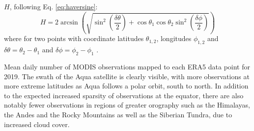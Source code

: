 \documentclass[hess, twostagejnl]{copernicus}
\providecommand{\DIFadd}[1]{{\protect\color{blue} \sf #1}} %
\providecommand{\DIFdel}[1]{{\protect\color{red} \scriptsize #1}} %
\providecommand{\DIFaddbegin}{} %
\providecommand{\DIFaddend}{} %
\providecommand{\DIFdelbegin}{} %
\providecommand{\DIFdelend}{} %
\providecommand{\DIFdelFL}[1]{\DIFdel{#1}} %
\begin{document}
\DIFdelend \DIFaddbegin \DIFadd{$H$, following Eq. \ref{eq:haversine}:
}\begin{equation}
	H = 2 \arcsin \left(\sqrt{\sin^2\left(\frac{\delta\theta}{2}\right) + \cos \theta_1 \cos \theta_2 \sin^2\left(\frac{\delta \phi}{2}\right) }\right)
	\label{eq:haversine}
\end{equation}\DIFaddend 
\DIFdelbegin \DIFdel{where
}%
\DIFdelend for two points with coordinate latitudes $\theta_{1,2}$, longitudes $\phi_{1,2}$ and $\delta \theta = \theta_2 - \theta_1$ and  $\delta \phi = \phi_2 - \phi_1$ . 

\DIFdelbegin %
{%
\DIFdelFL{Mean daily number of MODIS observations mapped to each ERA5 data point for 2019. The swath of the Aqua satellite is clearly visible, with more observations at more extreme latitudes as Aqua follows a polar orbit, south to north. In addition to the expected increased sparsity of observations at the equator, there are also notably fewer observations in regions of greater orography such as the Himalayas, the Andes and the  Rocky Mountains as well as the Siberian Tundra, due to increased cloud cover.}} 
\DIFdelend 
\end{document}
